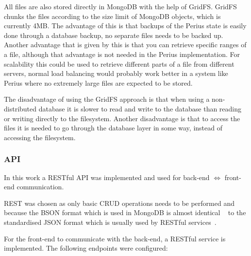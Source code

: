 \documentclass[a4paper,12pt]{article}
\newcounter{subsubsubsection}[subsubsection]
\newcommand{\Iff}{\Leftrightarrow}
\begin{document}
All files are also stored directly in MongoDB with the help of GridFS. GridFS chunks the files 
according to the size limit of MongoDB objects, which is currently 4MB. The advantage of this is 
that backups of the Perius state is easily done through a database backup, no separate files 
needs to be backed up. Another advantage that is given by this is that you can retrieve specific 
ranges of a file, although that advantage is not needed in the Perius implementation. For
scalability this could be used to retrieve different parts of a file from different servers, 
normal load balancing would probably work better in a system like Perius where no extremely large 
files are expected to be stored. 

The disadvantage of using the GridFS approach is that when using a non-distributed database 
it is slower to read and write to the database than reading or writing directly to the filesystem. 
Another disadvantage is that to access the files it is needed to go through the database layer 
in some way, instead of accessing the filesystem.

\subsubsection{API}
\label{sec:API}
In this work a RESTful API was implemented and used for back-end $\Iff$ front-end
communication.

REST was chosen as only basic CRUD operations needs to be performed and because the BSON format
which is used in MongoDB is almost identical ~\cite{BSON} to the standardised JSON format which is
usually used by RESTful services~\cite{JSON}. 

For the front-end to communicate with the back-end, a RESTful service is implemented.
The following endpoints were configured:
\end{document}
